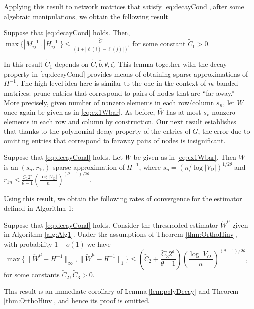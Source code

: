 \documentclass[opre,nonblindrev]{informs3} %
\begin{document}
Applying this result
to network matrices that satisfy \eqref{eq:decayCond}, 
after some algebraic manipulations,
we obtain the following result:	
\begin{lemma}\label{lem:jaffardDecay}
	Suppose that \eqref{eq:decayCond} holds. Then,
	$\max\{ |M^{-1}_{ij}|,|H^{-1}_{ij}|\} \leq
	\frac{\tilde C_1}{(1+|\ell(i)-\ell(j)|)^{\theta}}$
for some constant
$\tilde{C}_1 > 0$.
\end{lemma}
In this result $\tilde{C}_1$ 
depends on
$\tilde C,\bar{b}, \theta, \zeta$.
This lemma together with the decay property in \eqref{eq:decayCond}
provides means of obtaining sparse approximations of $H^{-1}$.
The high-level idea here is
similar to the one in the context of $m$-banded matrices:
prune entries that correspond to pairs of nodes that are ``far away.''
More precisely,  given number of nonzero elements in each row/column $s_n$,
let 
$\bar W$ once again be  given as in
\eqref{eq:ex1Wbar}.
As before, $\bar{W}$ has at most $s_n$ nonzero elements in each row and column by construction.
Our next result establishes that thanks to the polynomial decay property of the entries of $G$,
the error  due to omitting
entries that correspond to faraway pairs of nodes is insignificant.
 
 
\begin{lemma}\label{lem:polyDecay}
	Suppose that \eqref{eq:decayCond} holds.
	Let
	$\bar{W}$
	be given as in \eqref{eq:ex1Wbar}.
	Then $\bar{W}$
	is an $(s_n,r_{1n})$-sparse approximation
	of  $H^{-1}$, where
	$s_n =   (n/\log |V_O|)^{1/2\theta}  $ and
	$r_{1n} \leq \frac{\tilde C_1 2^\theta }{\theta-1}
	\left(\frac{\log|V_O|}{n}\right)^{(\theta-1)/2\theta}$.
\end{lemma}

Using this result, we obtain 
the following rates of convergence for the  estimator defined in
Algorithm 1:

\begin{corollary} \label{cor:polyDecay}
	Suppose that  \eqref{eq:decayCond} holds.
		Consider the 
		thresholded estimator
	$\check W^\mu$ 
	given  in 
	Algorithm \ref{alg:Alg1}.
Under the assumptions of Theorem \ref{thm:OrthoHinv}, with probability $1-o(1)$
we have
	\[ \max{\big \{}\| \check W^\mu-H^{-1}\|_\infty  , \|
	\check W^\mu-H^{-1}
	\|_1  {\big \}}
	\leq
	\left(\tilde{C}_2+\frac{\tilde{C}_3 2^\theta }{\theta-1}  \right)
	\left(\frac{\log|V_O|}{n}\right)^{(\theta-1)/2\theta},
	\]
	for some constants $\tilde{C}_2,\tilde{C}_3 >0$.
\end{corollary}
This result is an immediate corollary of   Lemma 
\ref{lem:polyDecay}
 and
Theorem \ref{thm:OrthoHinv}, and hence its proof is omitted.
\end{document}

